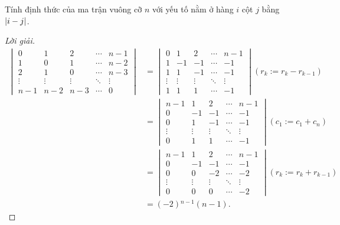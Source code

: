 \begin{exercise}
    Tính định thức của ma trận vuông cỡ $n$ với yếu tố nằm ở hàng $i$ cột $j$ bằng $\left|{i - j}\right|$.
\end{exercise}

\begin{proof}[Lời giải]
    \begingroup{}
    \allowdisplaybreaks{}
    \begin{align*}
        \begin{vmatrix}
            0      & 1      & 2      & \cdots & n - 1  \\
            1      & 0      & 1      & \cdots & n - 2  \\
            2      & 1      & 0      & \cdots & n - 3  \\
            \vdots & \vdots & \vdots & \ddots & \vdots \\
            n - 1  & n - 2  & n - 3  & \cdots & 0
        \end{vmatrix}
         & =
        \begin{vmatrix}
            0      & 1      & 2      & \cdots & n - 1  \\
            1      & -1     & -1     & \cdots & -1     \\
            1      & 1      & -1     & \cdots & -1     \\
            \vdots & \vdots & \vdots & \ddots & \vdots \\
            1      & 1      & 1      & \cdots & -1
        \end{vmatrix} (r_{k}:= r_{k} - r_{k - 1}) \\
         & =
        \begin{vmatrix}
            n - 1  & 1      & 2      & \cdots & n - 1  \\
            0      & -1     & -1     & \cdots & -1     \\
            0      & 1      & -1     & \cdots & -1     \\
            \vdots & \vdots & \vdots & \ddots & \vdots \\
            0      & 1      & 1      & \cdots & -1
        \end{vmatrix} (c_{1}:= c_{1} + c_{n}) \\
         & =
        \begin{vmatrix}
            n - 1  & 1      & 2      & \cdots & n - 1  \\
            0      & -1     & -1     & \cdots & -1     \\
            0      & 0      & -2     & \cdots & -2     \\
            \vdots & \vdots & \vdots & \ddots & \vdots \\
            0      & 0      & 0      & \cdots & -2
        \end{vmatrix} (r_{k}:= r_{k} + r_{k-1}) \\
         & = (-2){}^{n-1}(n - 1).
    \end{align*}
    \endgroup{}
\end{proof}

